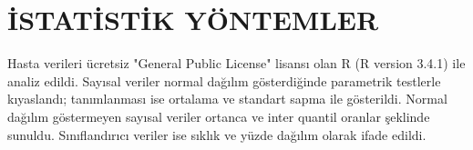 \section{İSTATİSTİK YÖNTEMLER}

Hasta verileri ücretsiz "General Public License" lisansı olan R (R version 3.4.1) ile analiz edildi. Sayısal veriler normal dağılım gösterdiğinde parametrik testlerle kıyaslandı; tanımlanması ise ortalama ve standart sapma ile gösterildi. Normal dağılım göstermeyen sayısal veriler ortanca ve inter quantil oranlar şeklinde sunuldu. Sınıflandırıcı veriler ise sıklık ve yüzde dağılım olarak ifade edildi.





